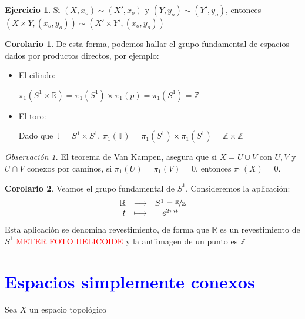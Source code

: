\documentclass[12pt,twoside]{report}
\theoremstyle{azul}
\theoremstyle{azul2}
\theoremstyle{plain}
\theoremstyle{definition}
\newtheorem*{cor}{Corolario}
\newtheorem*{ejer}{Ejercicio}
\theoremstyle{remark}
\newtheorem*{obs}{Observación}
\begin{document}
\begin{ejer}
    Si $(X,x_o) \sim (X',x_o)$ y $(Y,y_o) \sim (Y',y_o)$, entonces $(X \times Y, (x_o,y_o)) \sim (X' \times Y', (x_o,y_o))$
\end{ejer}
\begin{cor}
    De esta forma, podemos hallar el grupo fundamental de espacios dados por productos directos, por ejemplo: \vspace{-5mm}
    \begin{itemize}
        \item El cilindo:

        $\pi_1(S^1 \times \mathbb{R})=\pi_1(S^1) \times \pi_1(p) =\pi_1(S^1)=\mathbb{Z}$
        \item El toro:

        Dado que $\mathbb{T}=S^1 \times S^1$, $\pi_1(\mathbb{T})=\pi_1(S^1)\times \pi_1(S^1)=\mathbb{Z} \times \mathbb{Z}$
    \end{itemize}
\end{cor}
\begin{obs}
    El teorema de Van Kampen, asegura que si $X=U \cup V$ con $U,V$ y $U \cap V$ conexos por caminos, si $\pi_1(U)=\pi_1(V)=0$, entonces $\pi_1(X)=0$.
\end{obs}
\begin{cor}
    Veamos el grupo fundamental de $S^1$. Consideremos la aplicación:
    $$\begin{array}{rrcl}
         \mathbb{R} & \longrightarrow & S^1 = \mathlarger{\nicefrac{\mathbb{R}}{\mathbb{Z}}} \\
         t & \longmapsto & e^{2 \pi i t} 
    \end{array}$$
    Esta aplicación se denomina revestimiento, de forma que $\mathbb{R}$ es un revestimiento de $S^1$ \textcolor{red}{METER FOTO HELICOIDE} y la antiimagen de un punto es $\mathbb{Z}$    
\end{cor}
\section{\textcolor{blue}{Espacios simplemente conexos}}
Sea $X$ un espacio topológico
\end{document}
